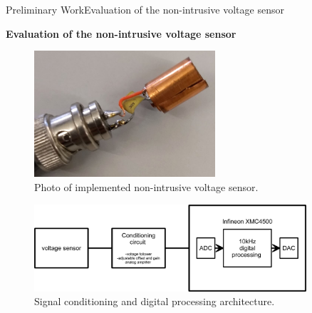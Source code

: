 \begin{frame}{Preliminary Work}{Evaluation of the non-intrusive voltage sensor}
\begin{block}{\textbf{Evaluation of the non-intrusive voltage sensor}}
	
		\begin{minipage}[t]{0.35\linewidth}
		
		\begin{figure}[ht!]
			\centering
				\includegraphics[width=0.6\textwidth,keepaspectratio]{figures/50.PreliminaryW/voltage_sensor}
			\caption{Photo of implemented non-intrusive voltage sensor.}
		\end{figure}
	\end{minipage}\hfill
	\begin{minipage}[t]{0.50\linewidth}
		
		
		\begin{figure}[ht!]
			\centering
			\includegraphics[width=0.9\textwidth,keepaspectratio]{figures/50.PreliminaryW/generalArchitecture}
			\caption{Signal conditioning and digital processing architecture.}
		\end{figure}
		
		
		
	\end{minipage}
	
	
	
\end{block}
\end{frame}

